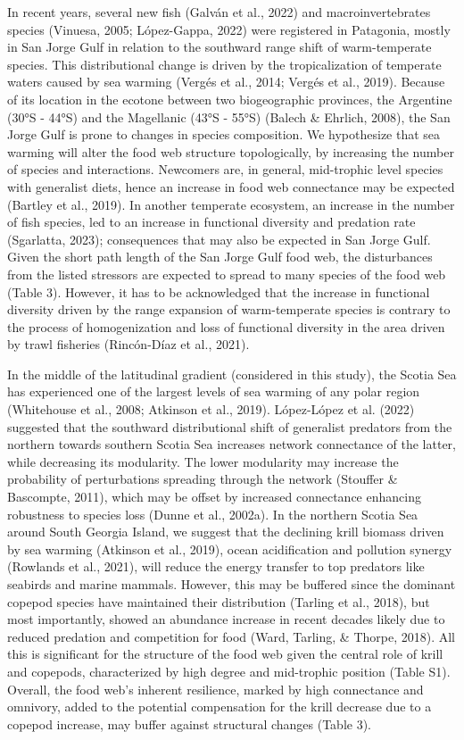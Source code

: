 \documentclass[
]{article}
\begin{document}
In recent years, several new fish (Galván et al., 2022) and
macroinvertebrates species (Vinuesa, 2005; López-Gappa, 2022) were
registered in Patagonia, mostly in San Jorge Gulf in relation to the
southward range shift of warm-temperate species. This distributional
change is driven by the tropicalization of temperate waters caused by
sea warming (Vergés et al., 2014; Vergés et al., 2019). Because of its
location in the ecotone between two biogeographic provinces, the
Argentine (30°S - 44°S) and the Magellanic (43°S - 55°S) (Balech \&
Ehrlich, 2008), the San Jorge Gulf is prone to changes in species
composition. We hypothesize that sea warming will alter the food web
structure topologically, by increasing the number of species and
interactions. Newcomers are, in general, mid-trophic level species with
generalist diets, hence an increase in food web connectance may be
expected (Bartley et al., 2019). In another temperate ecosystem, an
increase in the number of fish species, led to an increase in functional
diversity and predation rate (Sgarlatta, 2023); consequences that may
also be expected in San Jorge Gulf. Given the short path length of the
San Jorge Gulf food web, the disturbances from the listed stressors are
expected to spread to many species of the food web (Table 3). However,
it has to be acknowledged that the increase in functional diversity
driven by the range expansion of warm-temperate species is contrary to
the process of homogenization and loss of functional diversity in the
area driven by trawl fisheries (Rincón-Díaz et al., 2021).

In the middle of the latitudinal gradient (considered in this study),
the Scotia Sea has experienced one of the largest levels of sea warming
of any polar region (Whitehouse et al., 2008; Atkinson et al., 2019).
López-López et al. (2022) suggested that the southward distributional
shift of generalist predators from the northern towards southern Scotia
Sea increases network connectance of the latter, while decreasing its
modularity. The lower modularity may increase the probability of
perturbations spreading through the network (Stouffer \& Bascompte,
2011), which may be offset by increased connectance enhancing robustness
to species loss (Dunne et al., 2002a). In the northern Scotia Sea around
South Georgia Island, we suggest that the declining krill biomass driven
by sea warming (Atkinson et al., 2019), ocean acidification and
pollution synergy (Rowlands et al., 2021), will reduce the energy
transfer to top predators like seabirds and marine mammals. However,
this may be buffered since the dominant copepod species have maintained
their distribution (Tarling et al., 2018), but most importantly, showed
an abundance increase in recent decades likely due to reduced predation
and competition for food (Ward, Tarling, \& Thorpe, 2018). All this is
significant for the structure of the food web given the central role of
krill and copepods, characterized by high degree and mid-trophic
position (Table S1). Overall, the food web's inherent resilience, marked
by high connectance and omnivory, added to the potential compensation
for the krill decrease due to a copepod increase, may buffer against
structural changes (Table 3).
\end{document}
